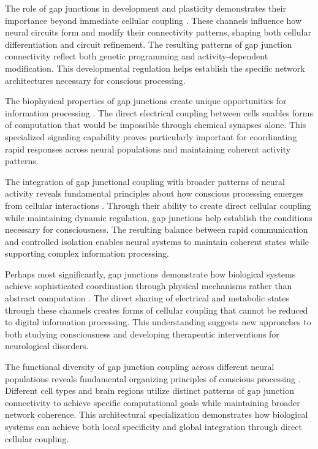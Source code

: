 The role of gap junctions in development and plasticity demonstrates their importance beyond immediate cellular coupling \cite{Nadarajah1996}. These channels influence how neural circuits form and modify their connectivity patterns, shaping both cellular differentiation and circuit refinement. The resulting patterns of gap junction connectivity reflect both genetic programming and activity-dependent modification. This developmental regulation helps establish the specific network architectures necessary for conscious processing.

The biophysical properties of gap junctions create unique opportunities for information processing \cite{Palacios-Prado2009}. The direct electrical coupling between cells enables forms of computation that would be impossible through chemical synapses alone. This specialized signaling capability proves particularly important for coordinating rapid responses across neural populations and maintaining coherent activity patterns.

The integration of gap junctional coupling with broader patterns of neural activity reveals fundamental principles about how conscious processing emerges from cellular interactions \cite{Nielsen2012}. Through their ability to create direct cellular coupling while maintaining dynamic regulation, gap junctions help establish the conditions necessary for consciousness. The resulting balance between rapid communication and controlled isolation enables neural systems to maintain coherent states while supporting complex information processing.

Perhaps most significantly, gap junctions demonstrate how biological systems achieve sophisticated coordination through physical mechanisms rather than abstract computation \cite{Bennett2004}. The direct sharing of electrical and metabolic states through these channels creates forms of cellular coupling that cannot be reduced to digital information processing. This understanding suggests new approaches to both studying consciousness and developing therapeutic interventions for neurological disorders.

The functional diversity of gap junction coupling across different neural populations reveals fundamental organizing principles of conscious processing \cite{Connors2004}. Different cell types and brain regions utilize distinct patterns of gap junction connectivity to achieve specific computational goals while maintaining broader network coherence. This architectural specialization demonstrates how biological systems can achieve both local specificity and global integration through direct cellular coupling.

